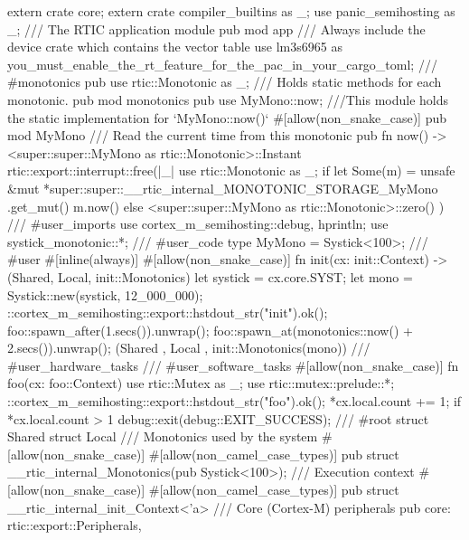 extern crate core;
extern crate compiler_builtins as _;
use panic_semihosting as _;
/// The RTIC application module
pub mod app {
    /// Always include the device crate which contains the vector table
    use lm3s6965 as you_must_enable_the_rt_feature_for_the_pac_in_your_cargo_toml;
    /// #monotonics
    pub use rtic::Monotonic as _;
    /// Holds static methods for each monotonic.
    pub mod monotonics {
        pub use MyMono::now;
        ///This module holds the static implementation for `MyMono::now()`
        #[allow(non_snake_case)]
        pub mod MyMono {
            /// Read the current time from this monotonic
            pub fn now() -> <super::super::MyMono as rtic::Monotonic>::Instant {
                rtic::export::interrupt::free(|_| {
                    use rtic::Monotonic as _;
                    if let Some(m) = unsafe {
                        &mut *super::super::__rtic_internal_MONOTONIC_STORAGE_MyMono
                            .get_mut()
                    } {
                        m.now()
                    } else {
                        <super::super::MyMono as rtic::Monotonic>::zero()
                    }
                })
            }
        }
    }
    /// #user_imports
    use cortex_m_semihosting::{debug, hprintln};
    use systick_monotonic::*;
    /// #user_code
    type MyMono = Systick<100>;
    /// #user
    #[inline(always)]
    #[allow(non_snake_case)]
    fn init(cx: init::Context) -> (Shared, Local, init::Monotonics) {
        let systick = cx.core.SYST;
        let mono = Systick::new(systick, 12_000_000);
        ::cortex_m_semihosting::export::hstdout_str("init\n").ok();
        foo::spawn_after(1.secs()).unwrap();
        foo::spawn_at(monotonics::now() + 2.secs()).unwrap();
        (Shared {}, Local {}, init::Monotonics(mono))
    }
    /// #user_hardware_tasks
    /// #user_software_tasks
    #[allow(non_snake_case)]
    fn foo(cx: foo::Context) {
        use rtic::Mutex as _;
        use rtic::mutex::prelude::*;
        ::cortex_m_semihosting::export::hstdout_str("foo\n").ok();
        *cx.local.count += 1;
        if *cx.local.count > 1 {
            debug::exit(debug::EXIT_SUCCESS);
        }
    }
    /// #root
    struct Shared {}
    struct Local {}
    /// Monotonics used by the system
    #[allow(non_snake_case)]
    #[allow(non_camel_case_types)]
    pub struct __rtic_internal_Monotonics(pub Systick<100>);
    /// Execution context
    #[allow(non_snake_case)]
    #[allow(non_camel_case_types)]
    pub struct __rtic_internal_init_Context<'a> {
        /// Core (Cortex-M) peripherals
        pub core: rtic::export::Peripherals,
}}

